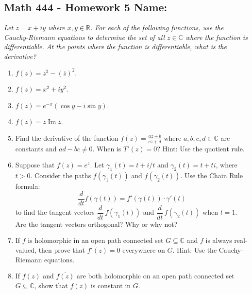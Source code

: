 \documentclass[11pt]{article}
\newcommand{\R}{\mathbb{R}}
\newcommand{\C}{\mathbb{C}}
\newcommand{\im}{\operatorname{Im}}
\begin{document}
\pagestyle{empty}
\subsection*{Math 444 - Homework 5 \hfill Name: \underline{\hspace*{2in}}}
\noindent
\textit{Let $z = x+iy$ where $x, y \in \R$.  For each of the following functions, use the Cauchy-Riemann equations to determine the set of all $z \in \C$ where the function is differentiable. At the points where the function is differentiable, what is the derivative?}

\begin{enumerate}
\item $f(z) = z^2 - (\overline{z})^2$. 
\vfill

\item $f(z) = x^2 + i y^2$.
\vfill 


\item $f(z) = e^{-x} (\cos y - i \sin y)$.
\vfill

\item $f(z) = z \im{z}$.
\vfill

\item Find the derivative of the function $f(z) = \frac{az+b}{cz+d}$ where $a,b,c,d \in \C$ are constants and $ad  - bc \ne 0$. When is $T'(z) = 0$? Hint: Use the quotient rule. 
\vfill


\newpage
\item Suppose that $f(z) = e^z$. Let $\gamma_1(t) = t + i/t$ and $\gamma_2(t) = t + ti$, where $t > 0$. Consider the paths $f(\gamma_1(t))$ and $f(\gamma_2(t))$.  
Use the Chain Rule formula: 
$$\frac{d}{dt} f(\gamma(t)) = f'(\gamma(t)) \cdot \gamma'(t)$$
to find the tangent vectors $\dfrac{d}{dt} \, f(\gamma_1(t))$ and $\dfrac{d}{dt} \, f(\gamma_2(t))$ when $t=1$.  Are the tangent vectors orthogonal? Why or why not?
\vfill

\item If $f$ is holomorphic in an open path connected set $G \subseteq \C$ and $f$ is always real-valued, then prove that $f'(z) = 0$ everywhere on $G$.  Hint: Use the Cauchy-Riemann equations. 
\vfill
\vfill

\item If $f(z)$ and $\overline{f(z)}$ are both holomorphic on an open path connected set $G \subseteq \C$, show that $f(z)$ is constant in $G$. 
\vfill
\vfill

\end{enumerate}
\end{document}
